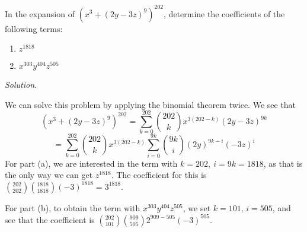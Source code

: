 \documentclass{article}
\theoremstyle{plain} %
\numberwithin{thm}{section} %
\theoremstyle{definition}
\begin{document}
    \begin{question}{2}
        In the expansion of $\left(x^3 + (2y - 3z)^9\right)^{202}$, determine the coefficients of the following terms:
        \begin{enumerate}[label=(\alph*)]
            \item $z^{1818}$ 
            \item $x^{303}y^{404}z^{505}$
        \end{enumerate}
        \textit{Solution.}
        
        We can solve this problem by applying the binomial theorem twice. We see that
        \[
            \left(x^3 + (2y - 3z)^9\right)^{202} = \sum_{k=0}^{202} {202\choose k}x^{3(202 - k)}(2y - 3z)^{9k}
        \]
        \[
            = \sum_{k=0}^{202} {202\choose k}x^{3(202 - k)}\sum_{i=0}^{9k} {9k \choose i}(2y)^{9k - i}(-3z)^{i}
        \]
        For part (a), we are interested in the term with \(k = 202,\ i = 9k = 1818\), as that is the only way we can get \(z^{1818}\). The coefficient for this is \({202 \choose 202}{1818 \choose 1818}(-3)^{1818} = 3^{1818}\).

        \medskip

        For part (b), to obtain the term with \(x^{303} y^{404} z^{505}\), we set \(k = 101\), \(i = 505\), and see that the coefficient is \({202\choose 101}{909\choose 505}2^{909 - 505}(-3)^{505}\).
    \end{question}
\end{document}
